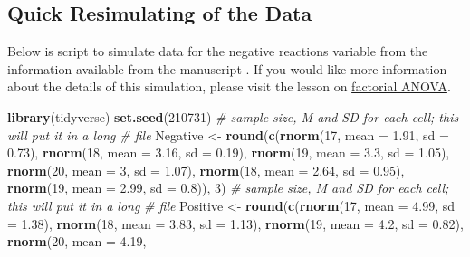 \documentclass[
  11pt,
]{book}
\newenvironment{Shaded}{\begin{snugshade}}{\end{snugshade}}
\newcommand{\AttributeTok}[1]{\textcolor[rgb]{0.27,0.27,0.27}{#1}}
\newcommand{\CommentTok}[1]{\textcolor[rgb]{0.37,0.37,0.37}{\textit{#1}}}
\newcommand{\DecValTok}[1]{\textcolor[rgb]{0.06,0.06,0.06}{#1}}
\newcommand{\FloatTok}[1]{\textcolor[rgb]{0.06,0.06,0.06}{#1}}
\newcommand{\FunctionTok}[1]{\textcolor[rgb]{0.27,0.27,0.27}{\textbf{#1}}}
\newcommand{\NormalTok}[1]{#1}
\newcommand{\OtherTok}[1]{\textcolor[rgb]{0.37,0.37,0.37}{#1}}
\begin{document}
\hypertarget{quick-resimulating-of-the-data}{%
\subsection*{Quick Resimulating of the Data}\label{quick-resimulating-of-the-data}}


Below is script to simulate data for the negative reactions variable from the information available from the manuscript \citep{ramdhani_affective_2018}. If you would like more information about the details of this simulation, please visit the lesson on \protect\hyperlink{between}{factorial ANOVA}.

\begin{Shaded}
\begin{Highlighting}[]
\FunctionTok{library}\NormalTok{(tidyverse)}
\FunctionTok{set.seed}\NormalTok{(}\DecValTok{210731}\NormalTok{)}
\CommentTok{\# sample size, M and SD for each cell; this will put it in a long}
\CommentTok{\# file}
\NormalTok{Negative }\OtherTok{\textless{}{-}} \FunctionTok{round}\NormalTok{(}\FunctionTok{c}\NormalTok{(}\FunctionTok{rnorm}\NormalTok{(}\DecValTok{17}\NormalTok{, }\AttributeTok{mean =} \FloatTok{1.91}\NormalTok{, }\AttributeTok{sd =} \FloatTok{0.73}\NormalTok{), }\FunctionTok{rnorm}\NormalTok{(}\DecValTok{18}\NormalTok{, }\AttributeTok{mean =} \FloatTok{3.16}\NormalTok{,}
    \AttributeTok{sd =} \FloatTok{0.19}\NormalTok{), }\FunctionTok{rnorm}\NormalTok{(}\DecValTok{19}\NormalTok{, }\AttributeTok{mean =} \FloatTok{3.3}\NormalTok{, }\AttributeTok{sd =} \FloatTok{1.05}\NormalTok{), }\FunctionTok{rnorm}\NormalTok{(}\DecValTok{20}\NormalTok{, }\AttributeTok{mean =} \DecValTok{3}\NormalTok{, }\AttributeTok{sd =} \FloatTok{1.07}\NormalTok{),}
    \FunctionTok{rnorm}\NormalTok{(}\DecValTok{18}\NormalTok{, }\AttributeTok{mean =} \FloatTok{2.64}\NormalTok{, }\AttributeTok{sd =} \FloatTok{0.95}\NormalTok{), }\FunctionTok{rnorm}\NormalTok{(}\DecValTok{19}\NormalTok{, }\AttributeTok{mean =} \FloatTok{2.99}\NormalTok{, }\AttributeTok{sd =} \FloatTok{0.8}\NormalTok{)),}
    \DecValTok{3}\NormalTok{)}
\CommentTok{\# sample size, M and SD for each cell; this will put it in a long}
\CommentTok{\# file}
\NormalTok{Positive }\OtherTok{\textless{}{-}} \FunctionTok{round}\NormalTok{(}\FunctionTok{c}\NormalTok{(}\FunctionTok{rnorm}\NormalTok{(}\DecValTok{17}\NormalTok{, }\AttributeTok{mean =} \FloatTok{4.99}\NormalTok{, }\AttributeTok{sd =} \FloatTok{1.38}\NormalTok{), }\FunctionTok{rnorm}\NormalTok{(}\DecValTok{18}\NormalTok{, }\AttributeTok{mean =} \FloatTok{3.83}\NormalTok{,}
    \AttributeTok{sd =} \FloatTok{1.13}\NormalTok{), }\FunctionTok{rnorm}\NormalTok{(}\DecValTok{19}\NormalTok{, }\AttributeTok{mean =} \FloatTok{4.2}\NormalTok{, }\AttributeTok{sd =} \FloatTok{0.82}\NormalTok{), }\FunctionTok{rnorm}\NormalTok{(}\DecValTok{20}\NormalTok{, }\AttributeTok{mean =} \FloatTok{4.19}\NormalTok{,}

\end{Highlighting}
\end{Shaded}
\end{document}
